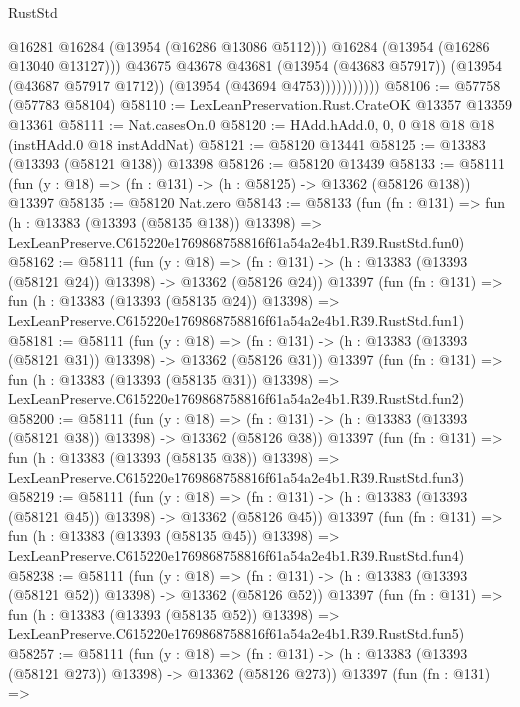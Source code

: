 \begin{lexlean}{RustStd}
\begin{coremodule}
                          @16281
                          @16284
                          (@13954 (@16286 @13086 @5112)))
                        @16284
                        (@13954 (@16286 @13040 @13127)))
                      @43675
                      @43678
                      @43681
                      (@13954 (@43683 @57917))
                      (@13954 (@43687 @57917 @1712))
                      (@13954 (@43694 @4753)))))))))))
@58106 := @57758 (@57783 @58104)
@58110 := LexLeanPreservation.Rust.CrateOK @13357 @13359 @13361
@58111 := Nat.casesOn.{0}
@58120 := HAdd.hAdd.{0, 0, 0} @18 @18 @18 (instHAdd.{0} @18 instAddNat)
@58121 := @58120 @13441
@58125 := @13383 (@13393 (@58121 @138)) @13398
@58126 := @58120 @13439
@58133 := @58111 (fun (y : @18) => (fn : @131) -> (h : @58125) -> @13362 (@58126 @138)) @13397
@58135 := @58120 Nat.zero
@58143 := @58133
    (fun (fn : @131) =>
    fun (h : @13383 (@13393 (@58135 @138)) @13398) =>
    LexLeanPreserve.C615220e1769868758816f61a54a2e4b1.R39.RustStd.fun0)
@58162 := @58111
    (fun (y : @18) =>
    (fn : @131) -> (h : @13383 (@13393 (@58121 @24)) @13398) -> @13362 (@58126 @24))
    @13397
    (fun (fn : @131) =>
    fun (h : @13383 (@13393 (@58135 @24)) @13398) =>
    LexLeanPreserve.C615220e1769868758816f61a54a2e4b1.R39.RustStd.fun1)
@58181 := @58111
    (fun (y : @18) =>
    (fn : @131) -> (h : @13383 (@13393 (@58121 @31)) @13398) -> @13362 (@58126 @31))
    @13397
    (fun (fn : @131) =>
    fun (h : @13383 (@13393 (@58135 @31)) @13398) =>
    LexLeanPreserve.C615220e1769868758816f61a54a2e4b1.R39.RustStd.fun2)
@58200 := @58111
    (fun (y : @18) =>
    (fn : @131) -> (h : @13383 (@13393 (@58121 @38)) @13398) -> @13362 (@58126 @38))
    @13397
    (fun (fn : @131) =>
    fun (h : @13383 (@13393 (@58135 @38)) @13398) =>
    LexLeanPreserve.C615220e1769868758816f61a54a2e4b1.R39.RustStd.fun3)
@58219 := @58111
    (fun (y : @18) =>
    (fn : @131) -> (h : @13383 (@13393 (@58121 @45)) @13398) -> @13362 (@58126 @45))
    @13397
    (fun (fn : @131) =>
    fun (h : @13383 (@13393 (@58135 @45)) @13398) =>
    LexLeanPreserve.C615220e1769868758816f61a54a2e4b1.R39.RustStd.fun4)
@58238 := @58111
    (fun (y : @18) =>
    (fn : @131) -> (h : @13383 (@13393 (@58121 @52)) @13398) -> @13362 (@58126 @52))
    @13397
    (fun (fn : @131) =>
    fun (h : @13383 (@13393 (@58135 @52)) @13398) =>
    LexLeanPreserve.C615220e1769868758816f61a54a2e4b1.R39.RustStd.fun5)
@58257 := @58111
    (fun (y : @18) =>
    (fn : @131) -> (h : @13383 (@13393 (@58121 @273)) @13398) -> @13362 (@58126 @273))
    @13397
    (fun (fn : @131) =>

\end{coremodule}
\end{lexlean}

